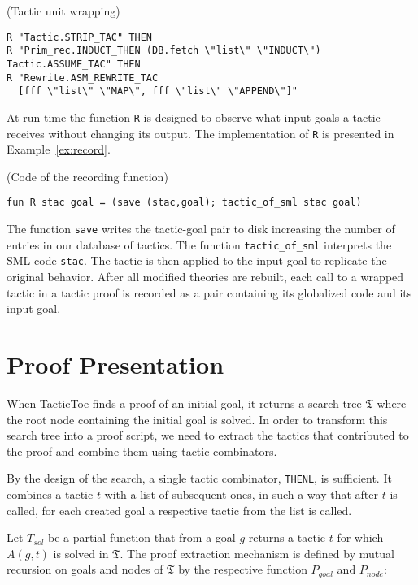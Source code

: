 \documentclass[runningheads,a4paper,draft]{svjour3}
\def\sml{\textsf{SML}\xspace}
\def\tactictoe{\textsf{TacticToe}\xspace}
\begin{document}
\begin{example}\label{ex:wrap} (Tactic unit wrapping)
\begin{lstlisting}[language=SMLSmall]
R "Tactic.STRIP_TAC" THEN
R "Prim_rec.INDUCT_THEN (DB.fetch \"list\" \"INDUCT\") Tactic.ASSUME_TAC" THEN
R "Rewrite.ASM_REWRITE_TAC
  [fff \"list\" \"MAP\", fff \"list\" \"APPEND\"]"
\end{lstlisting}
\end{example}

At run time the function \texttt{R} is designed to observe what input goals a
tactic  receives without changing its output. The implementation of \texttt{R}
is presented in Example~\ref{ex:record}.

\begin{example}\label{ex:record} (Code of the recording function)
\begin{lstlisting}[language=SMLSmall]
fun R stac goal = (save (stac,goal); tactic_of_sml stac goal)
\end{lstlisting}
\end{example}

The function \texttt{save} writes the tactic-goal pair to disk increasing the
number of entries in our database of tactics. The function
\texttt{tactic\_of\_sml} interprets the \sml code \texttt{stac}. The tactic is
then applied to the input goal to replicate the original behavior.
After all modified theories are rebuilt, each call to a wrapped tactic in a
tactic proof is recorded as a pair containing its globalized code and its
input goal.



\section{Proof Presentation}\label{sec:proofdisplay}

When \tactictoe finds a proof of an initial goal, it returns a search tree
$\mathfrak{T}$ where the root node containing the initial goal is solved.
In order to transform this search tree into a proof script, we need to extract
the tactics that contributed to the proof and combine them using tactic
combinators.

By the design of the search, a single tactic combinator, \texttt{THENL}, is
sufficient. It combines a tactic $t$ with a list of subsequent ones, in such a
way that after $t$ is called, for each created goal a respective
tactic from the list is called.

Let $T_{sol}$ be a partial function that from a goal $g$ returns a tactic $t$
for which $A(g,t)$ is solved in $\mathfrak{T}$.
The proof extraction mechanism is defined by mutual
recursion on goals and nodes of $\mathfrak{T}$ by the respective function
$P_{goal}$ and $P_{node}$:
\end{document}
